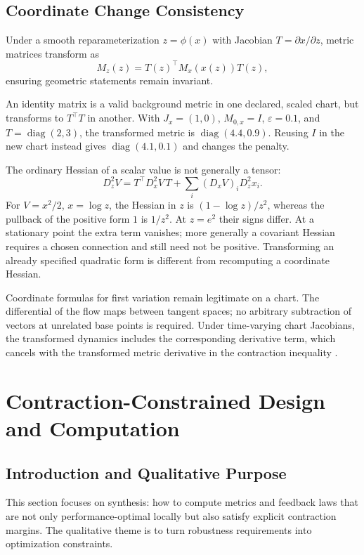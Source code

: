 \documentclass[11pt,letterpaper]{article}
\begin{document}
\subsection{Coordinate Change Consistency}
Under a smooth reparameterization $z=\phi(x)$ with Jacobian $T=\partial x/\partial z$, metric matrices transform as
\begin{equation}
M_z(z) = T(z)^\top M_x(x(z))T(z),
\label{eq:metric-transform}
\end{equation}
ensuring geometric statements remain invariant.

An identity matrix is a valid background metric in one declared, scaled chart, but transforms to $T^\top T$ in another. With $J_x=(1,0)$, $M_{0,x}=I$, $\varepsilon=0.1$, and $T=\operatorname{diag}(2,3)$, the transformed metric is $\operatorname{diag}(4.4,0.9)$. Reusing $I$ in the new chart instead gives $\operatorname{diag}(4.1,0.1)$ and changes the penalty.

The ordinary Hessian of a scalar value is not generally a tensor:
\[
D_z^2 V=T^\top D_x^2V\,T+\sum_i (D_xV)_i D_z^2x_i.
\]
For $V=x^2/2$, $x=\log z$, the Hessian in $z$ is $(1-\log z)/z^2$, whereas the pullback of the positive form $1$ is $1/z^2$. At $z=e^2$ their signs differ. At a stationary point the extra term vanishes; more generally a covariant Hessian requires a chosen connection and still need not be positive. Transforming an already specified quadratic form is different from recomputing a coordinate Hessian.

Coordinate formulas for first variation remain legitimate on a chart. The differential of the flow maps between tangent spaces; no arbitrary subtraction of vectors at unrelated base points is required. Under time-varying chart Jacobians, the transformed dynamics includes the corresponding derivative term, which cancels with the transformed metric derivative in the contraction inequality \citep{forni2014contraction}.

\section{Contraction-Constrained Design and Computation}

\subsection{Introduction and Qualitative Purpose}
This section focuses on synthesis: how to compute metrics and feedback laws that are not only performance-optimal locally but also satisfy explicit contraction margins. The qualitative theme is to turn robustness requirements into optimization constraints.
\end{document}

